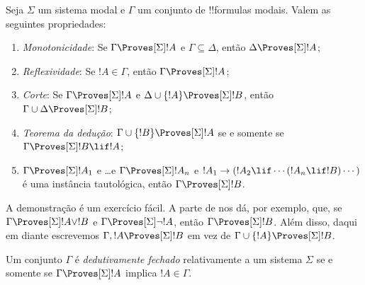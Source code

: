 \documentclass[../../../include/open-logic-section]{subfiles}
\begin{document}


\begin{prop}
  Seja $\Sigma$ um sistema modal e $\Gamma$ um conjunto de
  !!{formula}s modais. Valem as seguintes propriedades:
  \begin{enumerate}
  \item{} \emph{Monotonicidade}: Se
    $\Gamma \Proves[\Sigma] !A$ e $\Gamma \subseteq \Delta$, então
    $\Delta \Proves[\Sigma] !A$;
  \item{}
    \emph{Reflexividade}: Se $!A \in \Gamma$, então $\Gamma
    \Proves[\Sigma] !A$;
  \item{} \emph{Corte}: Se $\Gamma
    \Proves[\Sigma] !A$ e $\Delta \cup \{!A\} \Proves[\Sigma] !B$,
    então $\Gamma \cup \Delta \Proves[\Sigma] !B$;
  \item{} \emph{Teorema da dedução}: $\Gamma \cup \{!B\}
    \Proves[\Sigma] !A$ se e somente se $\Gamma \Proves[\Sigma] !B \lif
      !A$;
  \item {}%
    $\Gamma \Proves[\Sigma] !A_1$ e \dots e $\Gamma
    \Proves[\Sigma] !A_n$ e $!A_1 \to (!A_2 \lif \cdots (!A_n \lif
    !B)\cdots)$ é uma instância tautológica, então $\Gamma
    \Proves[\Sigma] !B$.
  \end{enumerate}
\end{prop}

A demonstração é um exercício fácil. A parte
 de 
nos dá, por exemplo, que, se $\Gamma \Proves[\Sigma] !A \lor !B$ e
$\Gamma \Proves[\Sigma] \lnot !A$, então $\Gamma \Proves[\Sigma]
!B$. Além disso, daqui em diante escrevemos
$\Gamma, !A \Proves[\Sigma] !B$ em vez de
$\Gamma \cup \{ !A\} \Proves[\Sigma] !B$.

\begin{defn}
  Um conjunto $\Gamma$ é \emph{dedutivamente fechado} relativamente a
  um sistema $\Sigma$ se e somente se $\Gamma \Proves[\Sigma] !A$ implica
  $!A \in \Gamma$.
\end{defn}
\end{document}

